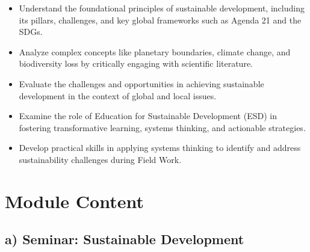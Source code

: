 \documentclass[
  letterpaper,
  10pt,
  openany]{book}
\providecommand{\tightlist}{%
  \setlength{\itemsep}{0pt}\setlength{\parskip}{0pt}}\usepackage{longtable,booktabs,array}
\begin{document}
\begin{itemize}
\tightlist
\item
  Understand the foundational principles of sustainable development,
  including its pillars, challenges, and key global frameworks such as
  Agenda 21 and the SDGs.
\item
  Analyze complex concepts like planetary boundaries, climate change,
  and biodiversity loss by critically engaging with scientific
  literature.
\item
  Evaluate the challenges and opportunities in achieving sustainable
  development in the context of global and local issues.
\item
  Examine the role of Education for Sustainable Development (ESD) in
  fostering transformative learning, systems thinking, and actionable
  strategies.
\item
  Develop practical skills in applying systems thinking to identify and
  address sustainability challenges during Field Work.
\end{itemize}

\section*{Module Content}\label{module-content-1}


\subsection*{a) Seminar: Sustainable
Development}\label{a-seminar-sustainable-development}
\end{document}
